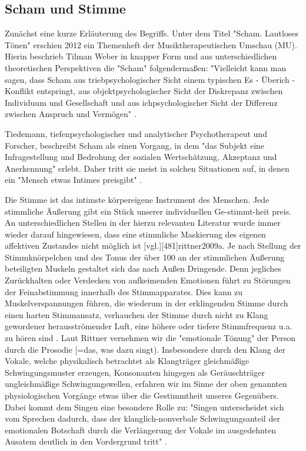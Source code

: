 \subsection{Scham und Stimme}
Zunächst eine kurze Erläuterung des Begriffs. Unter dem Titel "Scham. Lautloses Tönen" erschien 2012 ein Themenheft der Musiktherapeutischen Umschau (MU). Hierin beschrieb Tilman Weber in knapper Form und aus unterschiedlichen theoretischen Perspektiven die "Scham" folgendermaßen:
"Vielleicht kann man sagen, dass Scham aus triebpsychologischer Sicht einem typischen Es - Überich - Konflikt entspringt, aus objektpsychologischer Sicht der Diskrepanz zwischen Individuum und Gesellschaft und aus ichpsychologischer Sicht der Differenz zwischen Anspruch und Vermögen" \autocite[215]{weber2012}. 

Tiedemann, tiefenpsychologischer und analytischer Psychotherapeut und Forscher, beschreibt Scham als einen Vorgang, in dem "das Subjekt eine Infragestellung und Bedrohung der sozialen Wertschätzung, Akzeptanz und Anerkennung" \autocite[219]{tiedemann2012} erlebt. Daher tritt sie meist in solchen Situationen auf, in denen ein "Mensch etwas Intimes preisgibt" \autocite[219]{tiedemann2012}. 

Die Stimme ist das intimste körpereigene Instrument des Menschen. Jede stimmliche Äußerung gibt ein Stück unserer individuellen Ge-stimmt-heit preis. An unterschiedlichen Stellen in der hierzu relevanten Literatur wurde immer wieder darauf hingewiesen, dass eine stimmliche Maskierung des eigenen affektiven Zustandes nicht möglich ist \autocite[vgl.][279]{deckervoigt1992}[vgl.][481]{rittner2009a}. Je nach Stellung der Stimmknörpelchen und des Tonus der über 100 an der stimmlichen Äußerung beteiligten Muskeln \autocite[vgl.][40]{cramer1998} gestaltet sich das nach Außen Dringende. Denn jegliches Zurückhalten oder Verdecken von aufkeimenden Emotionen führt zu Störungen der Feinabstimmung innerhalb des Stimmapparates. Dies kann zu Muskelverspannungen führen, die wiederum in der erklingenden Stimme durch einen harten Stimmansatz, verhauchen der Stimme durch nicht zu Klang gewordener herausströmender Luft, eine höhere oder tiefere Stimmfrequenz u.a. zu hören sind \autocite[vgl.][279]{deckervoigt1992}. 
Laut Rittner vernehmen wir die "emotionale Tönung" der Person durch die Prosodie [=das, was dazu singt). Insbesondere durch den Klang der Vokale, welche physikalisch betrachtet als Klangträger gleichmäßige Schwingungsmuster erzeugen, Konsonanten hingegen als Geräuschträger ungleichmäßige Schwingungswellen, erfahren wir im Sinne der oben genannten physiologischen Vorgänge etwas über die Gestimmtheit unseres Gegenübers. Dabei kommt dem Singen eine besondere Rolle zu: "Singen unterscheidet sich vom Sprechen dadurch, dass der klanglich-nonverbale Schwingungsanteil der emotionalen Botschaft durch die Verlängerung der Vokale im ausgedehnten Ausatem deutlich in den Vordergrund tritt" \autocite[205]{rittner2008}.

